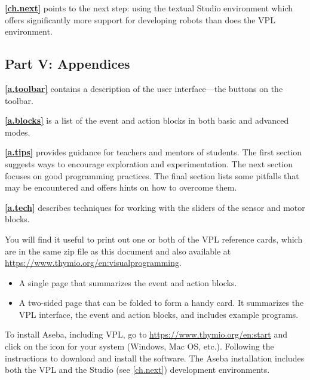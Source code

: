 \textbf{\cref{ch.next}} points to the next step: using the
textual Studio environment which offers significantly more support for
developing robots than does the VPL environment.


\subsection*{Part V: Appendices}

\textbf{\cref{a.toolbar}} contains a description of the user
interface---the buttons on the toolbar.

\textbf{\cref{a.blocks}} is a list of the event and
action blocks in both basic and advanced modes.

\textbf{\cref{a.tips}} provides guidance for teachers and
mentors of students. The first section suggests ways to encourage
exploration and experimentation. The next section focuses on good
programming practices. The final section lists some pitfalls that may be
encountered and offers hints on how to overcome them.

\textbf{\cref{a.tech}} describes techniques for working with the
sliders of the sensor and motor blocks.

 \quad {}



You will find it useful to print out one or both of the VPL reference cards,
which are in the same zip file as this document and also available
at \href{https://www.thymio.org/en:visualprogramming}{https://www.thymio.org/en:visualprogramming}.

\begin{itemize}
\item A single page that summarizes the event and action blocks.
\item A two-sided page that can be folded to form a handy card.
It summarizes the VPL interface, the event and action blocks,
and includes example programs.
\end{itemize}


To install Aseba, including VPL, go to
\href{https://www.thymio.org/en:start}{https://www.thymio.org/en:start}
and click on the icon for your system (Windows, Mac OS, etc.). Following
the instructions to download and install the software. The Aseba
installation includes both the VPL and the Studio (see \cref{ch.next})
development environments.
